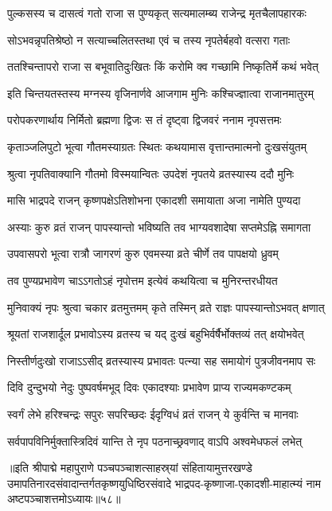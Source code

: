 \twolineshloka
{पुल्कसस्य च दासत्वं गतो राजा स पुण्यकृत्}
{सत्यमालम्ब्य राजेन्द्र मृतचैलापहारकः}%

\twolineshloka
{सोऽभवन्नृपतिश्रेष्ठो न सत्याच्चलितस्तथा}
{एवं च तस्य नृपतेर्बहवो वत्सरा गताः}%

\twolineshloka
{ततश्चिन्तापरो राजा स बभूवातिदुःखितः}
{किं करोमि क्व गच्छामि निष्कृतिर्मे कथं भवेत्}%

\twolineshloka
{इति चिन्तयतस्तस्य मग्नस्य वृजिनार्णवे}
{आजगाम मुनिः कश्चिज्ज्ञात्वा राजानमातुरम्}%

\twolineshloka
{परोपकरणार्थाय निर्मितो ब्रह्मणा द्विजः}
{स तं दृष्ट्वा द्विजवरं ननाम नृपसत्तमः}%

\twolineshloka
{कृताञ्जलिपुटो भूत्वा गौतमस्याग्रतः स्थितः}
{कथयामास वृत्तान्तमात्मनो दुःखसंयुतम्}%

\twolineshloka
{श्रुत्वा नृपतिवाक्यानि गौतमो विस्मयान्वितः}
{उपदेशं नृपतये व्रतस्यास्य ददौ मुनिः}%

\twolineshloka
{मासि भाद्रपदे राजन् कृष्णपक्षेऽतिशोभना}
{एकादशी समायाता  अजा नामेति पुण्यदा}%

\twolineshloka
{अस्याः कुरु व्रतं राजन् पापस्यान्तो भविष्यति}
{तव भाग्यवशादेषा सप्तमेऽह्नि समागता}%

\twolineshloka
{उपवासपरो भूत्वा रात्रौ जागरणं कुरु}
{एवमस्या व्रते चीर्णे तव पापक्षयो ध्रुवम्}%

\twolineshloka
{तव पुण्यप्रभावेण चाऽऽगतोऽहं नृपोत्तम}
{इत्येवं कथयित्वा च मुनिरन्तरधीयत}%

\twolineshloka
{मुनिवाक्यं नृपः श्रुत्वा चकार व्रतमुत्तमम्}
{कृते तस्मिन् व्रते राज्ञः पापस्यान्तोऽभवत् क्षणात्}%

\twolineshloka
{श्रूयतां राजशार्दूल प्रभावोऽस्य व्रतस्य च}
{यद् दुःखं बहुभिर्वर्षैर्भोक्तव्यं तत् क्षयोभवेत्}%

\twolineshloka
{निस्तीर्णदुःखो राजाऽऽसीद् व्रतस्यास्य प्रभावतः}
{पत्न्या सह समायोगं पुत्रजीवनमाप सः}%

\twolineshloka
{दिवि दुन्दुभयो नेदुः पुष्पवर्षमभूद् दिवः}
{एकादश्याः प्रभावेण प्राप्य राज्यमकण्टकम्}%

\twolineshloka
{स्वर्गं लेभे हरिश्चन्द्रः सपुरः सपरिच्छदः}
{ईदृग्विधं व्रतं राजन् ये कुर्वन्ति च मानवाः}%

\twolineshloka
{सर्वपापविनिर्मुक्तास्त्रिदिवं यान्ति ते नृप}
{पठनाच्छ्रवणाद् वाऽपि अश्वमेधफलं लभेत्}%

॥इति श्रीपाद्मे महापुराणे पञ्चपञ्चाशत्साहस्र्यां संहितायामुत्तरखण्डे उमापतिनारदसंवादान्तर्गतकृष्णयुधिष्ठिरसंवादे भाद्रपद-कृष्णाजा-एकादशी-माहात्म्यं नाम अष्टपञ्चाशत्तमोऽध्यायः॥५८॥

